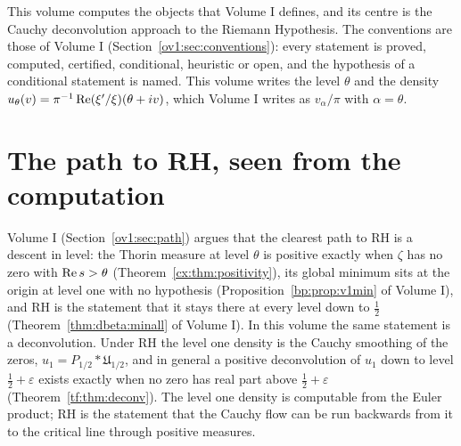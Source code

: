 
This volume computes the objects that Volume I defines, and its centre is the Cauchy deconvolution approach to the Riemann Hypothesis. The conventions are those of Volume I (Section~\ref{ov1:sec:conventions}): every statement is proved, computed, certified, conditional, heuristic or open, and the hypothesis of a conditional statement is named. This volume writes the level $\theta$ and the density $u_\theta(v)=\pi^{-1}\operatorname{Re}(\xi'/\xi)(\theta+iv)$, which Volume I writes as $v_\alpha/\pi$ with $\alpha=\theta$.

\section{The path to RH, seen from the computation}\label{ov2:sec:path}

Volume I (Section~\ref{ov1:sec:path}) argues that the clearest path to RH is a descent in level: the Thorin measure at level $\theta$ is positive exactly when $\zeta$ has no zero with $\operatorname{Re} s>\theta$ (Theorem~\ref{cx:thm:positivity}), its global minimum sits at the origin at level one with no hypothesis (Proposition~\ref{bp:prop:v1min} of Volume I), and RH is the statement that it stays there at every level down to $\frac12$ (Theorem~\ref{thm:dbeta:minall} of Volume I). In this volume the same statement is a deconvolution. Under RH the level one density is the Cauchy smoothing of the zeros, $u_1=P_{1/2}*\mathfrak U_{1/2}$, and in general a positive deconvolution of $u_1$ down to level $\frac12+\varepsilon$ exists exactly when no zero has real part above $\frac12+\varepsilon$ (Theorem~\ref{tf:thm:deconv}). The level one density is computable from the Euler product; RH is the statement that the Cauchy flow can be run backwards from it to the critical line through positive measures.

